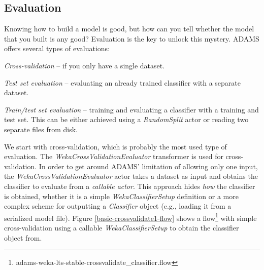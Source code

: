 \clearpage
\subsection{Evaluation}
Knowing how to build a model is good, but how can you tell whether the model
that you built is any good? Evaluation is the key to unlock this mystery.
ADAMS offers several types of evaluations:
\begin{tight_itemize}
	\item \textit{Cross-validation} -- if you only have a single dataset.
	\item \textit{Test set evaluation} -- evaluating an already trained classifier
	with a separate dataset.
	\item \textit{Train/test set evaluation} -- training and evaluating a
	classifier with a training and test set. This can be either achieved using a
	\textit{RandomSplit} actor or reading two separate files from disk.
\end{tight_itemize}

We start with cross-validation, which is probably the most used type of
evaluation. The \textit{WekaCrossValidationEvaluator} transformer is used for
cross-validation. In order to get around ADAMS' limitation of allowing only one
input, the \textit{WekaCrossValidationEvaluator} actor takes a dataset as input
and obtains the classifier to evaluate from a \textit{callable actor}. This
approach hides \textit{how} the classifier is obtained, whether it is a simple
\textit{WekaClassifierSetup} definition or a more complex scheme for outputting a
\textit{Classifier} object (e.g., loading it from a serialized model file).
Figure \ref{basic-crossvalidate1-flow} shows a
flow\footnote{adams-weka-lts-stable-crossvalidate\_classifier.flow} with simple
cross-validation using a callable \textit{WekaClassifierSetup} to obtain the classifier
object from.

